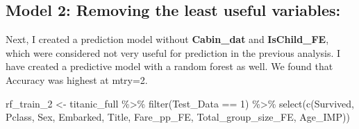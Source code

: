 \documentclass[
]{article}
\newenvironment{Shaded}{\begin{snugshade}}{\end{snugshade}}
\newcommand{\AttributeTok}[1]{\textcolor[rgb]{0.77,0.63,0.00}{#1}}
\newcommand{\ConstantTok}[1]{\textcolor[rgb]{0.00,0.00,0.00}{#1}}
\newcommand{\DecValTok}[1]{\textcolor[rgb]{0.00,0.00,0.81}{#1}}
\newcommand{\FunctionTok}[1]{\textcolor[rgb]{0.00,0.00,0.00}{#1}}
\newcommand{\NormalTok}[1]{#1}
\newcommand{\OtherTok}[1]{\textcolor[rgb]{0.56,0.35,0.01}{#1}}
\newcommand{\SpecialCharTok}[1]{\textcolor[rgb]{0.00,0.00,0.00}{#1}}
\newcommand{\StringTok}[1]{\textcolor[rgb]{0.31,0.60,0.02}{#1}}
\begin{document}
\hypertarget{model-2-removing-the-least-useful-variables}{%
\subsection{\texorpdfstring{\textbf{Model 2: Removing the least useful
variables:}}{Model 2: Removing the least useful variables:}}\label{model-2-removing-the-least-useful-variables}}

Next, I created a prediction model without \textbf{Cabin\_dat} and
\textbf{IsChild\_FE}, which were considered not very useful for
prediction in the previous analysis. I have created a predictive model
with a random forest as well. We found that Accuracy was highest at
mtry=2.

\begin{Shaded}
\begin{Highlighting}[]
\NormalTok{rf\_train\_2 }\OtherTok{\textless{}{-}}\NormalTok{ titanic\_full }\SpecialCharTok{\%\textgreater{}\%}
  \FunctionTok{filter}\NormalTok{(Test\_Data }\SpecialCharTok{==} \DecValTok{1}\NormalTok{) }\SpecialCharTok{\%\textgreater{}\%}
  \FunctionTok{select}\NormalTok{(}\FunctionTok{c}\NormalTok{(Survived, Pclass, Sex, Embarked, Title, Fare\_pp\_FE, Total\_group\_size\_FE, Age\_IMP))}
\end{Highlighting}
\end{Shaded}

\begin{Shaded}
\end{Shaded}
\end{document}
